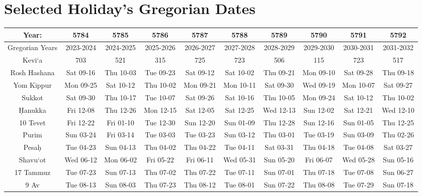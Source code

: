 \chapter{Selected Holiday's Gregorian Dates}
\begin{footnotesize}
	\begin{tabular}{c | c | c | c | c | c | c | c | c | c}
		Year:&5784&5785&5786&5787&5788&5789&5790&5791&5792\\\hline
		Gregorian Years&2023-2024&2024-2025&2025-2026&2026-2027&2027-2028&2028-2029&2029-2030&2030-2031&2031-2032\\\hline
		Kevi`a&703&521&315&725&723&506&115&723&517\\\hline
		Rosh Hashana&Sat 09-16&Thu 10-03&Tue 09-23&Sat 09-12&Sat 10-02&Thu 09-21&Mon 09-10&Sat 09-28&Thu 09-18\\\hline
		Yom Kippur&Mon 09-25&Sat 10-12&Thu 10-02&Mon 09-21&Mon 10-11&Sat 09-30&Wed 09-19&Mon 10-07&Sat 09-27\\\hline
		Sukkot&Sat 09-30&Thu 10-17&Tue 10-07&Sat 09-26&Sat 10-16&Thu 10-05&Mon 09-24&Sat 10-12&Thu 10-02\\\hline
		\d{H}anukka&Fri 12-08&Thu 12-26&Mon 12-15&Sat 12-05&Sat 12-25&Wed 12-13&Sun 12-02&Sat 12-21&Wed 12-10\\\hline
		10 Tevet&Fri 12-22&Fri 01-10&Tue 12-30&Sun 12-20&Sun 01-09&Thu 12-28&Sun 12-16&Sun 01-05&Thu 12-25\\\hline
		Purim&Sun 03-24&Fri 03-14&Tue 03-03&Tue 03-23&Sun 03-12&Thu 03-01&Tue 03-19&Sun 03-09&Thu 02-26\\\hline
		Pesa\d{h}&Tue 04-23&Sun 04-13&Thu 04-02&Thu 04-22&Tue 04-11&Sat 03-31&Thu 04-18&Tue 04-08&Sat 03-27\\\hline
		Shavu`ot&Wed 06-12&Mon 06-02&Fri 05-22&Fri 06-11&Wed 05-31&Sun 05-20&Fri 06-07&Wed 05-28&Sun 05-16\\\hline
		17 Tammuz&Tue 07-23&Sun 07-13&Thu 07-02&Thu 07-22&Tue 07-11&Sun 07-01&Thu 07-18&Tue 07-08&Sun 06-27\\\hline
		9 Av&Tue 08-13&Sun 08-03&Thu 07-23&Thu 08-12&Tue 08-01&Sun 07-22&Thu 08-08&Tue 07-29&Sun 07-18\\\hline
	\end{tabular}
	

\end{footnotesize}
